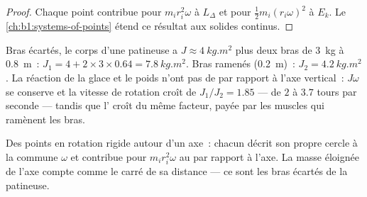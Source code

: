 \begin{proof}
Chaque point contribue pour $m_ir_i^2\omega$ à $L_\Delta$ et pour
$\tfrac12 m_i(r_i\omega)^2$ à $E_k$. Le \cref{ch:b1:systems-of-points}
étend ce résultat aux solides continus.
\end{proof}

\begin{example}[La patineuse]\label{ex:b1:angular-momentum:skater}
Bras écartés, le corps d'une patineuse a $J \approx \qty{4}{kg.m^2}$ plus
deux bras de \qty{3}{kg} à \qty{0.8}{m}~: $J_1 = 4 + 2 \times 3 \times 0.64 =
\qty{7.8}{kg.m^2}$. Bras ramenés (\qty{0.2}{m})~: $J_2 = \qty{4.2}{kg.m^2}$.
La réaction de la glace et le poids n'ont pas de  par rapport à
l'axe vertical~: $J\omega$ se conserve et la vitesse de rotation croît
de $J_1/J_2 = 1.85$ --- de $2$ à $3.7$ tours par seconde --- tandis que
l' croît du même facteur, payée par les muscles qui
ramènent les bras.
\end{example}

\begin{omfigure}

{\small Des points en rotation rigide autour d'un axe~: chacun décrit
son propre cercle à la  commune $\omega$ et contribue
pour $m_ir_i^2\omega$ au  par rapport à l'axe. La masse
éloignée de l'axe compte comme le carré de sa distance --- ce sont les
bras écartés de la patineuse.}
\end{omfigure}

